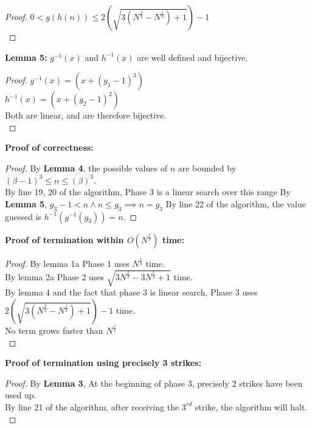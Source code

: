 \begin{problem}
\begin{proof}
    $0 < g(h(n)) \leq 2(\sqrt{3(N^{\frac{2}{3}} - N^{\frac{1}{3}}) + 1}) - 1$ \\
  \end{proof}
  \textbf{Lemma 5:} $g^{-1}(x)$ and $h^{-1}(x)$ are well defined and bijective.
  \begin{proof}
    $g^{-1}(x) = (x + (g_1 - 1)^3)$ \\
    $h^{-1}(x) = (x + (g_2 - 1)^2)$ \\
    Both are linear, and are therefore bijective. \\
  \end{proof}
  \textbf{Proof of correctness:}
  \begin{proof}
  By \textbf{Lemma 4}, the possible values of $n$ are bounded by $(\beta - 1)^3 \leq n \leq (\beta)^3$. \\
  By line 19, 20 of the algorithm, Phase 3 is a linear search over this range
  By \textbf{Lemma 5}, $g_3 - 1 < n \land n \leq g_3 \implies n = g_3$
  By line 22 of the algorithm, the value guessed is $h^{-1}(g^{-1}(g_3)) = n$.
  \end{proof}
  \textbf{Proof of termination within $O(N^{\frac{1}{3}})$ time:}
  \begin{proof}
    By lemma 1a Phase 1 uses $N^{\frac{1}{3}}$ time. \\
    By lemma 2a Phase 2 uses $\sqrt{3N^{\frac{2}{3}} - 3N^{\frac{1}{3}} + 1}$ time. \\
    By lemma 4 and the fact that phase 3 is linear search, Phase 3 uses $2(\sqrt{3(N^{\frac{2}{3}} - N^{\frac{1}{3}}) + 1}) - 1$ time. \\
    No term grows faster than $N^{\frac{1}{3}}$ \\
  \end{proof}
  \textbf{Proof of termination using precisely 3 strikes:}
  \begin{proof}
    By \textbf{Lemma 3}, At the beginning of phase 3, precisely $2$ strikes have been used up. \\
    By line 21 of the algorithm, after receiving the $3^{rd}$ strike, the algorithm will halt. \\
  \end{proof}
\end{problem}
